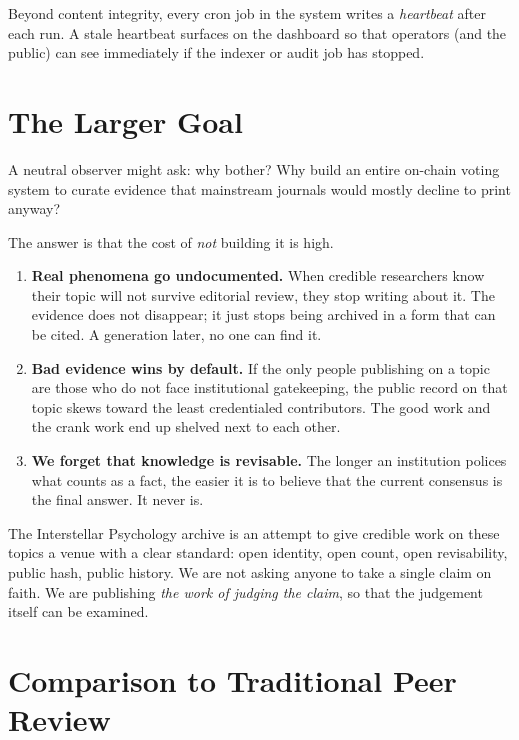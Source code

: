 \documentclass[11pt,a4paper]{article}
\begin{document}
Beyond content integrity, every cron job in the system writes a
\emph{heartbeat} after each run. A stale heartbeat surfaces on the
dashboard so that operators (and the public) can see immediately if
the indexer or audit job has stopped.

\section{The Larger Goal}

A neutral observer might ask: why bother? Why build an entire on-chain
voting system to curate evidence that mainstream journals would
mostly decline to print anyway?

The answer is that the cost of \emph{not} building it is high.

\begin{enumerate}[leftmargin=1.5em]
  \item \textbf{Real phenomena go undocumented.} When credible
        researchers know their topic will not survive editorial
        review, they stop writing about it. The evidence does not
        disappear; it just stops being archived in a form that can
        be cited. A generation later, no one can find it.
  \item \textbf{Bad evidence wins by default.} If the only people
        publishing on a topic are those who do not face institutional
        gatekeeping, the public record on that topic skews toward
        the least credentialed contributors. The good work and the
        crank work end up shelved next to each other.
  \item \textbf{We forget that knowledge is revisable.} The longer
        an institution polices what counts as a fact, the easier it
        is to believe that the current consensus is the final answer.
        It never is.
\end{enumerate}

The Interstellar Psychology archive is an attempt to give credible
work on these topics a venue with a clear standard: open identity,
open count, open revisability, public hash, public history. We are
not asking anyone to take a single claim on faith. We are publishing
\emph{the work of judging the claim}, so that the judgement itself
can be examined.

\section{Comparison to Traditional Peer Review}
\end{document}
